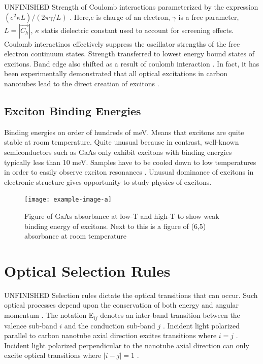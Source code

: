 {\color{red} UNFINISHED} Strength of Coulomb interactions parameterized by the expression $(e^2 \kappa L)/(2 \pi \gamma/L) $ \cite{ando1997excitons}. Here,$e$ is charge of an electron, $\gamma$ is a free parameter, $L = |\vec{C_h} |$, $\kappa$ statis dielectric constant used to account for screening effects. Coulomb interactinos effectively suppress the oscillator strengths of the free electron continuum states. Strength transferred to lowest energy bound states of excitons. Band edge also shifted as a result of coulomb interaction \cite{ando1997excitons}. In fact, it has been experimentally demonstrated that all optical excitations in carbon nanotubes lead to the direct creation of excitons \cite{wang2005optical}. 



\subsection{Exciton Binding Energies}


Binding energies on order of hundreds of meV. Means that excitons are quite stable at room temperature. Quite unusual because in contrast, well-known semiconductors such as GaAs only exhibit excitons with binding energies typically less than 10 meV. Samples have to be cooled down to low temperatures in order to easily observe exciton resonances \cite{liang1970excitons}. Unusual dominance of excitons in electronic structure gives opportunity to study physics of excitons.



\begin{figure}[h]
	\centering
	\texttt{[image: example-image-a]}
	\caption{Figure of GaAs absorbance at low-T and high-T to show weak binding energy of excitons. Next to this is a figure of  (6,5) absorbance at room temperature}
	\label{fig:gaas_vs_cnt_absorbance}
\end{figure}


\section{Optical Selection Rules}

{\color{red}UNFINISHED} Selection rules dictate the optical transitions that can occur. Such optical processes depend upon the conservation of both energy and angular momentum \cite{weismanKonoBook}. The notation E$_{ij}$ denotes an inter-band transition between the valence sub-band $i$ and the conduction sub-band $j$ \cite{weismanKonoBook}. Incident light polarized parallel to carbon nanotube axial direction excites transitions where $i=j$ \cite{weismanKonoBook}. Incident light polarized perpendicular to the nanotube axial direction can only excite optical transitions where $|i-j|=1$ \cite{weismanKonoBook}. 


